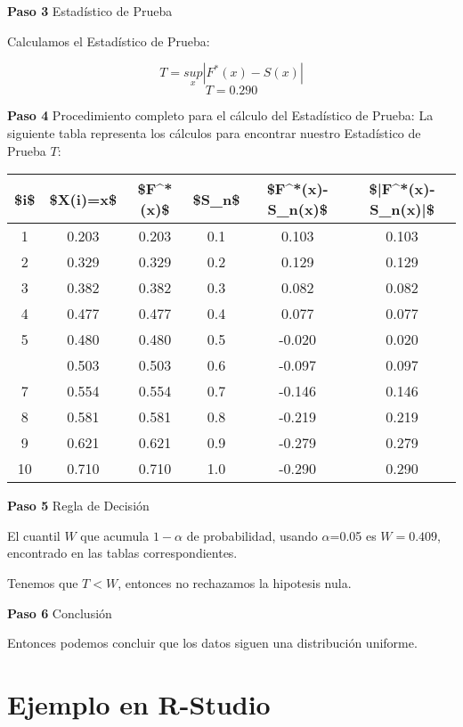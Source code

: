 \documentclass[
  a4paper,
  oneside,
  openany]{book}
\begin{document}
\textbf{Paso 3} Estadístico de Prueba

Calculamos el Estadístico de Prueba:

\[T=\underset{x}{sup}|F^*(x)-S(x)|\]
\[T=0.290\]

\textbf{Paso 4} Procedimiento completo para el cálculo del Estadístico de Prueba:
La siguiente tabla representa los cálculos para encontrar nuestro Estadístico de Prueba \(T\):

\begin{table}
\centering
\begin{tabular}{cccccc}
\toprule
\$i\$ & \$X(i)=x\$ & \$F\textasciicircum{}*(x)\$ & \$S\_n\$ & \$F\textasciicircum{}*(x)-S\_n(x)\$ & \$|F\textasciicircum{}*(x)-S\_n(x)|\$\\
\midrule
1 & 0.203 & 0.203 & 0.1 & 0.103 & 0.103\\
2 & 0.329 & 0.329 & 0.2 & 0.129 & 0.129\\
3 & 0.382 & 0.382 & 0.3 & 0.082 & 0.082\\
4 & 0.477 & 0.477 & 0.4 & 0.077 & 0.077\\
5 & 0.480 & 0.480 & 0.5 & -0.020 & 0.020\\
\addlinespace
6 & 0.503 & 0.503 & 0.6 & -0.097 & 0.097\\
7 & 0.554 & 0.554 & 0.7 & -0.146 & 0.146\\
8 & 0.581 & 0.581 & 0.8 & -0.219 & 0.219\\
9 & 0.621 & 0.621 & 0.9 & -0.279 & 0.279\\
10 & 0.710 & 0.710 & 1.0 & -0.290 & 0.290\\
\bottomrule
\end{tabular}
\end{table}

\textbf{Paso 5} Regla de Decisión

El cuantil \(W\) que acumula \(1-\alpha\) de probabilidad, usando \(\alpha\)=0.05 es \(W=0.409\), encontrado en las tablas correspondientes.

Tenemos que \(T<W\), entonces no rechazamos la hipotesis nula.

\textbf{Paso 6} Conclusión

Entonces podemos concluir que los datos siguen una distribución uniforme.

\hypertarget{ejemplo-en-r-studio-14}{%
\section{Ejemplo en R-Studio}\label{ejemplo-en-r-studio-14}}
\end{document}
